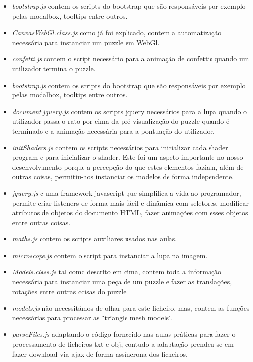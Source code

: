 \documentclass[pdftex,12pt,a4paper]{report}
\begin{document}
\begin{itemize}  
        \item \textit{bootstrap.js} contem os scripts do bootstrap que são responsáveis por exemplo pelas modalbox, tooltips entre outros.
        \item \textit{CanvasWebGl.class.js} como já foi explicado, contem a automatização necessária para instanciar um puzzle em WebGl.
        \item \textit{confetti.js} contem o script necessário para a animação de confettis quando um utilizador termina o puzzle.
        \item \textit{bootstrap.js} contem os scripts do bootstrap que são responsáveis por exemplo pelas modalbox, tooltips entre outros.
        \item \textit{document.jquery.js} contem os scripts jquery necessários para a lupa quando o utilizador passa o rato por cima da pré-visualização do puzzle quando é terminado e a animação necessária para a pontuação do utilizador.
        \item \textit{initShaders.js} contem os scripts necessários para inicializar cada shader program e para inicializar o shader. Este foi um aspeto importante no nosso desenvolvimento porque a percepção do que estes elementos faziam, além de outras coisas, permitiu-nos instanciar os modelos de forma independente.
        \item \textit{jquery.js} é uma framework javascript que simplifica a vida ao programador, permite criar listeners de forma mais fácil e dinâmica com seletores, modificar atributos de objetos do documento HTML, fazer animações com esses objetos entre outras coisas.
        \item \textit{maths.js} contem os scripts auxiliares usados nas aulas.
        \item \textit{microscope.js} contem o script para instanciar a lupa na imagem.
        \item \textit{Models.class.js} tal como descrito em cima, contem toda a informação necessária para instanciar uma peça de um puzzle e fazer as translações, rotações entre outras coisas do puzzle.
        \item \textit{models.js} não necessitámos de olhar para este ficheiro, mas, contem as funções necessárias para processar as "triangle mesh models".
        \item \textit{parseFiles.js} adaptando o código fornecido nas aulas práticas para fazer o processamento de ficheiros txt e obj, contudo a adaptação prendeu-se em fazer download via ajax de forma assíncrona dos ficheiros.

\end{itemize}
\end{document}
